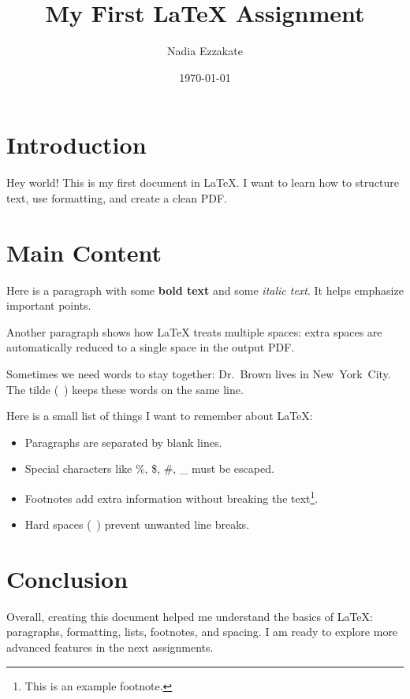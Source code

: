\documentclass[a4paper,12pt]{article}
\begin{document}
\title{My First LaTeX Assignment}
\author{Nadia Ezzakate}
\date{\today}

\maketitle

\section*{Introduction}
Hey world!  
This is my first document in \LaTeX.  
I want to learn how to structure text, use formatting, and create a clean PDF.

\section*{Main Content}
Here is a paragraph with some \textbf{bold text} and some \textit{italic text}.  
It helps emphasize important points.

Another paragraph shows how LaTeX treats       multiple spaces:  
extra spaces are automatically reduced to a single space in the output PDF.  

Sometimes we need words to stay together:  
Dr.~Brown lives in New~York~City.  
The tilde (~) keeps these words on the same line.

Here is a small list of things I want to remember about LaTeX:
\begin{itemize}
    \item Paragraphs are separated by blank lines.
    \item Special characters like \%, \$, \#, \_ must be escaped.
    \item Footnotes add extra information without breaking the text\footnote{This is an example footnote.}.
    \item Hard spaces (~) prevent unwanted line breaks.
\end{itemize}

\section*{Conclusion}
Overall, creating this document helped me understand the basics of LaTeX: paragraphs, formatting, lists, footnotes, and spacing.  
I am ready to explore more advanced features in the next assignments.
\end{document}
